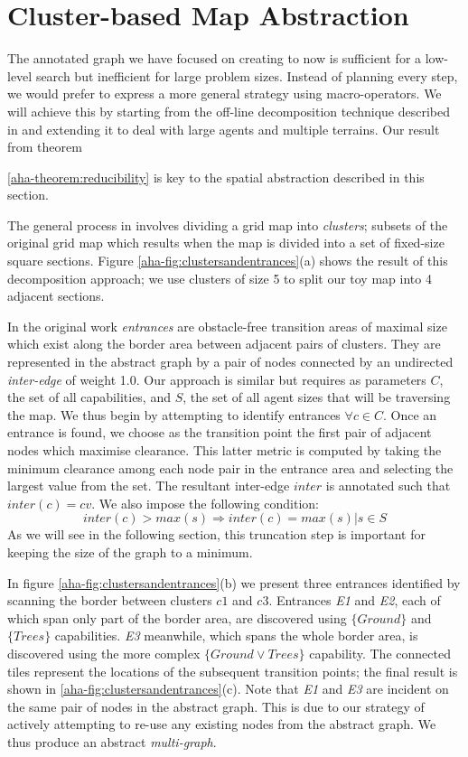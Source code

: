 \section{Cluster-based Map Abstraction}
\label{aha:mapabstraction}
The annotated graph we have focused on creating to now is sufficient for a low-level search but inefficient for large problem sizes. 
Instead of planning every step, we would prefer to express a more general strategy using macro-operators.
We will achieve this by starting from the off-line decomposition technique described in \cite{botea04} and extending it to deal with large agents and multiple terrains. 
Our result from theorem {\ref{aha-theorem:reducibility} is key to the spatial abstraction described in this section. 
\par \indent
The general process in \cite{botea04} involves dividing a grid map into \emph{clusters}; subsets of the original grid map which results when the map is divided into a set of fixed-size square sections. Figure \ref{aha-fig:clustersandentrances}(a) shows the result of this decomposition approach; we use clusters of size 5 to split our toy map into 4 adjacent sections.
\par \indent
In the original work \emph{entrances} are obstacle-free transition areas of maximal size which exist along the border area between adjacent pairs of clusters. They are represented in the abstract graph by a pair of nodes connected by an undirected \emph{inter-edge} of weight 1.0. 
Our approach is similar but requires as parameters $C$, the set of all capabilities, and $S$, the set of all agent sizes that will be traversing the map. We thus begin by attempting to identify entrances $\forall c \in C$. Once an entrance is found, we choose as the transition point the first pair of adjacent nodes which maximise clearance. This latter metric is computed by taking the minimum clearance among each node pair in the entrance area and selecting the largest value from the set. The resultant inter-edge $inter$ is annotated such that $inter(c) = cv$. We also impose the following condition:
\begin{equation}
inter(c) > max(s) \Rightarrow inter(c) = max(s) | s \in S
\end{equation}
As we will see in the following section, this truncation step is important for keeping the size of the graph to a minimum.
\par \indent
In figure \ref{aha-fig:clustersandentrances}(b) we present three entrances identified by scanning the border between clusters $c1$ and $c3$.
Entrances \emph{E1} and \emph{E2}, each of which span only part of the border area, are discovered using $\lbrace Ground \rbrace$ and $\lbrace Trees \rbrace$ capabilities. \emph{E3} meanwhile, which spans the whole border area, is discovered using the more complex $\lbrace Ground \vee Trees \rbrace$ capability. 
The connected tiles represent the locations of the subsequent transition points; the final result is shown in \ref{aha-fig:clustersandentrances}(c). 
Note that \emph{E1} and \emph{E3} are incident on the same pair of nodes in the abstract graph. This is due to our  strategy of actively attempting to re-use any existing nodes from the abstract graph. 
We thus produce an abstract \emph{multi-graph}.

}

